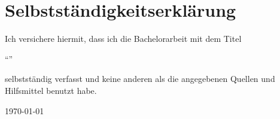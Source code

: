 \chapter*{Selbstständigkeitserklärung}
\thispagestyle{empty}
%
\begin{flushleft}
Ich versichere hiermit, dass ich die Bachelorarbeit mit dem Titel\\
\doublespacing
\begin{singlespace}
	\enquote{\myTitleLong}
\end{singlespace}
\doublespacing
\begin{singlespace}
	selbstständig verfasst und keine anderen als die angegebenen Quellen und Hilfsmittel benutzt habe.
\end{singlespace}
\today\\
\vspace*{1.5cm}
\authorname
\end{flushleft}

	